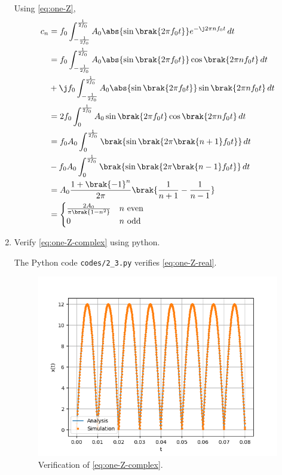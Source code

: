 \documentclass[journal,12pt,twocolumn]{IEEEtran}
\renewcommand\thesection{\arabic{section}}
\begin{document}
\begin{enumerate}[label=\thesection.\arabic*,ref=\thesection.\theenumi]
\solution Using \eqref{eq:one-Z},
\begin{align}
    c_n &= f_0\int_{-\frac{1}{2f_0}}^{\frac{1}{2f_0}}A_0\abs{\sin\brak{2\pi f_0t}}
    e^{-\j2\pi nf_0t}\, dt \\
        &= f_0\int_{-\frac{1}{2f_0}}^{\frac{1}{2f_0}}A_0\abs{\sin\brak{2\pi f_0t}}
    \cos\brak{2\pi nf_0t}\, dt \nonumber \\
        &+ \j f_0\int_{-\frac{1}{2f_0}}^{\frac{1}{2f_0}}A_0
        \abs{\sin\brak{2\pi f_0t}}\sin\brak{2\pi nf_0t}\, dt \\
        &= 2f_0\int_{0}^{\frac{1}{2f_0}}A_0\sin\brak{2\pi f_0t}\cos\brak{2\pi nf_0t}\, dt \\
        &= f_0A_0\int_{0}^{\frac{1}{2f_0}}\brak{\sin\brak{2\pi\brak{n+1}f_0t}}\, dt \nonumber \\ 
        &- f_0A_0\int_{0}^{\frac{1}{2f_0}}\brak{\sin\brak{2\pi\brak{n-1}f_0t}}\, dt \\ 
        &= A_0\frac{1+\brak{-1}^n}{2\pi}\brak{\frac{1}{n+1} - \frac{1}{n-1}} \\
        &= 
        \begin{cases}
            \frac{2A_0}{\pi\brak{1-n^2}} & n\ \text{even} \\
            0 & n\ \text{odd}
        \end{cases}
        \label{eq:ck-xt}
\end{align}
\item Verify 
	\eqref{eq:one-Z-complex}
	using python.

\solution The Python code \texttt{codes/2\_3.py} verifies \eqref{eq:one-Z-real}.
\begin{figure}[!ht]
    \includegraphics[width=\columnwidth]{figs/2_3.png}
    \caption{Verification of \eqref{eq:one-Z-complex}.}
    \label{fig:ver-complex}
\end{figure}


\end{enumerate}
\end{document}
